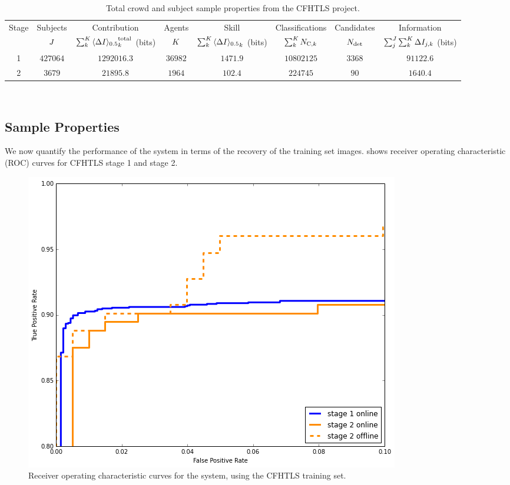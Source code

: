 \documentclass[useAMS,usenatbib,a4paper]{mn2e}
\begin{document}
\begin{table}
\begin{center}
\caption{Total crowd and subject sample properties from the CFHTLS project.}
\label{tab:crowd:contributions}
\begin{tabular}{cccccccc}
  \hline
  \hline {Stage} & Subjects & Contribution                          & Agents & Skill      & Classifications          & Candidates & Information \\
                 & $J$    & $\sum_k^{K} {\langle \Delta I \rangle_{0.5}}^{\rm total}_k$ (bits) & $K$  & $\sum_k^{K} {\langle \Delta I \rangle_{0.5}}_k$ (bits) & $\sum_k^{K} N_{{\rm C},k}$ & $N_{\rm det}$  & $\sum_j^{J}\sum_k^{K} \Delta I_{j,k}$ (bits) \\
  \hline 
            1    & $427064$ & $1292016.3$ & $36982$ & $1471.9$ & $10802125$ & $3368$ & $91122.6$ \\
            2    & $3679$   &   $21895.8$ &  $1964$ &  $102.4$ &   $224745$ &   $90$ &  $1640.4$ \\
  \hline \hline
\end{tabular}
\medskip\\
\end{center}
\end{table}


\subsection{Sample Properties}
\label{sec:results:sample}

We now quantify the performance of the \sw system in terms of the recovery of
the training set images.  shows receiver
operating characteristic (ROC) curves for CFHTLS stage 1 and stage 2. 

\begin{figure}
\centering\includegraphics[width=0.9\linewidth]{sw-system-figs/roc.png}
\caption{Receiver operating characteristic curves for the \sw system, using
the CFHTLS training set.}
\label{fig:results:sample:roc}
\end{figure}
\end{document}

